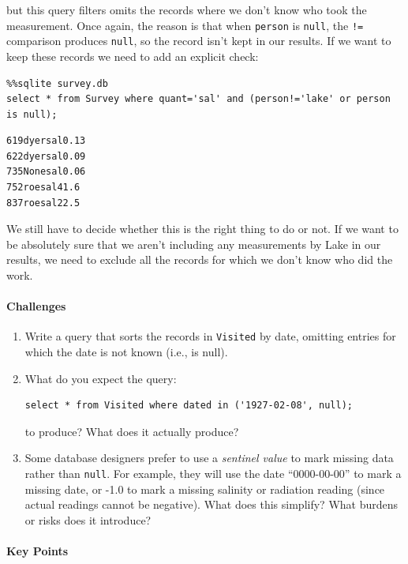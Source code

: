 \documentclass[]{book}
\newcommand{\gdef}[2]{\emph{#2}}
\begin{document}
but this query filters omits the records where we don't know who took
the measurement. Once again, the reason is that when \texttt{person} is
\texttt{null}, the \texttt{!=} comparison produces \texttt{null}, so the
record isn't kept in our results. If we want to keep these records we
need to add an explicit check:

\begin{verbatim}
%%sqlite survey.db
select * from Survey where quant='sal' and (person!='lake' or person is null);
\end{verbatim}

\begin{verbatim}
619dyersal0.13
622dyersal0.09
735Nonesal0.06
752roesal41.6
837roesal22.5
\end{verbatim}

We still have to decide whether this is the right thing to do or not. If
we want to be absolutely sure that we aren't including any measurements
by Lake in our results, we need to exclude all the records for which we
don't know who did the work.

\mbox{}\paragraph{Challenges}

\begin{enumerate}
\item
  Write a query that sorts the records in \texttt{Visited} by date,
  omitting entries for which the date is not known (i.e., is null).
\item
  What do you expect the query:

\begin{verbatim}
select * from Visited where dated in ('1927-02-08', null);
\end{verbatim}

  to produce? What does it actually produce?
\item
  Some database designers prefer to use a
  \gdef{g:sentinel-value}{sentinel value} to mark missing data
  rather than \texttt{null}. For example, they will use the date
  ``0000-00-00'' to mark a missing date, or -1.0 to mark a missing
  salinity or radiation reading (since actual readings cannot be
  negative). What does this simplify? What burdens or risks does it
  introduce?
\end{enumerate}

\mbox{}\paragraph{Key Points}
\end{document}
